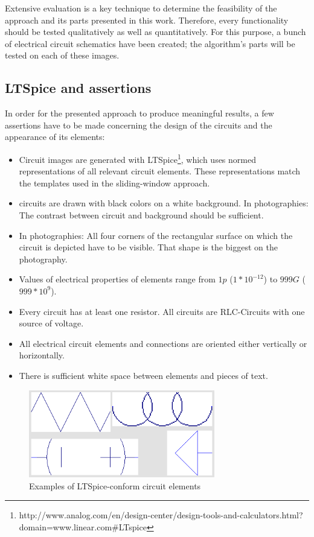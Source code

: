 \documentclass[10pt,twocolumn,letterpaper]{article}
\begin{document}
Extensive evaluation is a key technique to determine the feasibility of the approach and its parts presented in this work. Therefore, every functionality should be tested qualitatively as well as quantitatively. For this purpose, a bunch of electrical circuit schematics have been created; the algorithm's parts will be tested on each of these images. 
\par

\subsection{LTSpice and assertions}
\label{subsec:spice}

In order for the presented approach to produce meaningful results, a few assertions have to be made concerning the design of the circuits and the appearance of its elements:

\begin{itemize}
	\item Circuit images are generated with LTSpice\footnote[1]{http://www.analog.com/en/design-center/design-tools-and-calculators.html?domain=www.linear.com\#LTspice}, which uses normed representations of all relevant circuit elements. These representations match the templates used in the sliding-window approach.
	\item circuits are drawn with black colors on a white background. In photographies: The contrast between circuit and background should be sufficient.
	\item In photographies: All four corners of the rectangular surface on which the circuit is depicted have to be visible. That shape is the biggest on the photography.
	\item Values of electrical properties of elements range from $1p$ ($1 * 10^{-12}$) to $999G$ ($999* 10^{9}$).
	\item Every circuit has at least one resistor. All circuits are RLC-Circuits with one source of voltage.
	\item All electrical circuit elements and connections are oriented either vertically or horizontally.
	\item There is sufficient white space between elements and pieces of text.
\end{itemize}
\par

\begin{figure}[!ht]
\includegraphics[width = 3.2in]{img/elements.png}
\caption{Examples of LTSpice-conform circuit elements}
\label{fig:c4}
\end{figure}
\end{document}
